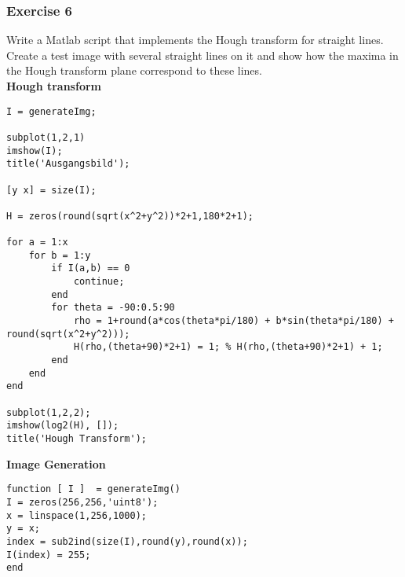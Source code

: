 \subsubsection{Exercise 6}
Write a Matlab script that implements the Hough transform for straight lines. Create a test image with several straight lines on it and show how the maxima in the Hough transform plane correspond to these lines.\\
\textbf{Hough transform}
\begin{lstlisting}
I = generateImg;

subplot(1,2,1)
imshow(I);
title('Ausgangsbild');

[y x] = size(I);

H = zeros(round(sqrt(x^2+y^2))*2+1,180*2+1);

for a = 1:x
    for b = 1:y
        if I(a,b) == 0
            continue;            
        end
        for theta = -90:0.5:90
            rho = 1+round(a*cos(theta*pi/180) + b*sin(theta*pi/180) + round(sqrt(x^2+y^2)));
            H(rho,(theta+90)*2+1) = 1; % H(rho,(theta+90)*2+1) + 1;
        end
    end
end

subplot(1,2,2);
imshow(log2(H), []);
title('Hough Transform');
\end{lstlisting}
\textbf{Image Generation}
\begin{lstlisting}
function [ I ]  = generateImg()
I = zeros(256,256,'uint8');
x = linspace(1,256,1000);
y = x;
index = sub2ind(size(I),round(y),round(x));
I(index) = 255;
end
\end{lstlisting}